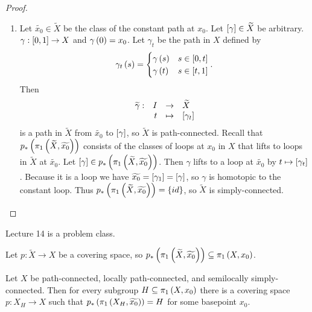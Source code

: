 \begin{proof}
\begin{enumerate}
\item Let $ \widetilde{x_0} \in \widetilde{X} $ be the class of the constant path at $ x_0 $. Let $ \sb{\gamma} \in \widetilde{X} $ be arbitrary. $ \gamma : \sb{0, 1} \to X $ and $ \gamma\rb{0} = x_0 $. Let $ \gamma_t $ be the path in $ X $ defined by
$$ \gamma_t\rb{s} =
\begin{cases}
\gamma\rb{s} & s \in \sb{0, t} \\
\gamma\rb{t} & s \in \sb{t, 1}
\end{cases}.
$$
Then
$$ \function[\widetilde{\gamma}]{I}{\widetilde{X}}{t}{\sb{\gamma_t}} $$
is a path in $ \widetilde{X} $ from $ \widetilde{x_0} $ to $ \sb{\gamma} $, so $ \widetilde{X} $ is path-connected. Recall that $ p_*\rb{\pi_1\rb{\widetilde{X}, \widetilde{x_0}}} $ consists of the classes of loops at $ x_0 $ in $ X $ that lifts to loops in $ \widetilde{X} $ at $ \widetilde{x_0} $. Let $ \sb{\gamma} \in p_*\rb{\pi_1\rb{\widetilde{X}, \widetilde{x_0}}} $. Then $ \gamma $ lifts to a loop at $ \widetilde{x_0} $ by $ t \mapsto \sb{\gamma_t} $. Because it is a loop we have $ \widetilde{x_0} = \sb{\gamma_1} = \sb{\gamma} $, so $ \gamma $ is homotopic to the constant loop. Thus $ p_*\rb{\pi_1\rb{\widetilde{X}, \widetilde{x_0}}} = \cb{id} $, so $ \widetilde{X} $ is simply-connected.
\end{enumerate}
\end{proof}


Lecture 14 is a problem class.


Let $ p : \widetilde{X} \to X $ be a covering space, so $ p_*\rb{\pi_1\rb{\widetilde{X}, \widetilde{x_0}}} \subseteq \pi_1\rb{X, x_0} $.

\begin{proposition}
\label{prop:1.36}
Let $ X $ be path-connected, locally path-connected, and semilocally simply-connected. Then for every subgroup $ H \subseteq \pi_1\rb{X, x_0} $ there is a covering space $ p : X_H \to X $ such that $ p_*\rb{\pi_1\rb{X_H, \widetilde{x_0}}} = H $ for some basepoint $ x_0 $.
\end{proposition}

